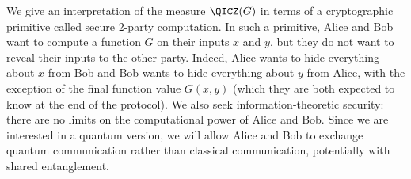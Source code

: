 





















































































































\setcounter{theorem}{5}We give an interpretation of the measure $\QICZ(G)$ in terms
of a cryptographic primitive called secure 2-party computation.
In such a primitive, Alice and Bob want to compute a function
$G$ on their inputs $x$ and $y$,
but they do not want to reveal their
inputs to the other party. Indeed, Alice wants to hide
everything about $x$ from Bob and Bob wants to hide
everything about $y$ from Alice, with the exception
of the final function value $G(x,y)$ (which they are
both expected to know at the end of the protocol).
We also seek information-theoretic security:
there are no limits on the computational power of Alice and Bob.
Since we are interested in a quantum version, we will
allow Alice and Bob to exchange quantum communication rather
than classical communication, potentially with shared entanglement.

